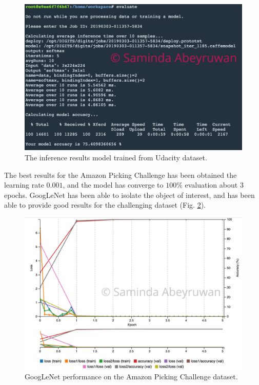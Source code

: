 \documentclass[10pt,journal,compsoc]{IEEEtran}
\begin{document}
\begin{figure}[thpb]
      \centering
      \includegraphics[width=\linewidth]{E1}
      \caption{The inference results model trained from Udacity dataset.}
      \label{fig:e1}
\end{figure}

The best results for the Amazon Picking Challenge has been obtained  the learning rate $0.001$, and the model has converge to $100$\% evaluation about $3$ epochs. GoogLeNet has been able to isolate the object of interest, and has been able to provide good results for the challenging dataset (Fig. \ref{fig:m2}).

\begin{figure}[thpb]
      \centering
      \includegraphics[width=\linewidth]{M1}
      \caption{GoogLeNet performance on the  Amazon Picking Challenge dataset.}
      \label{fig:m2}
\end{figure}
\end{document}

